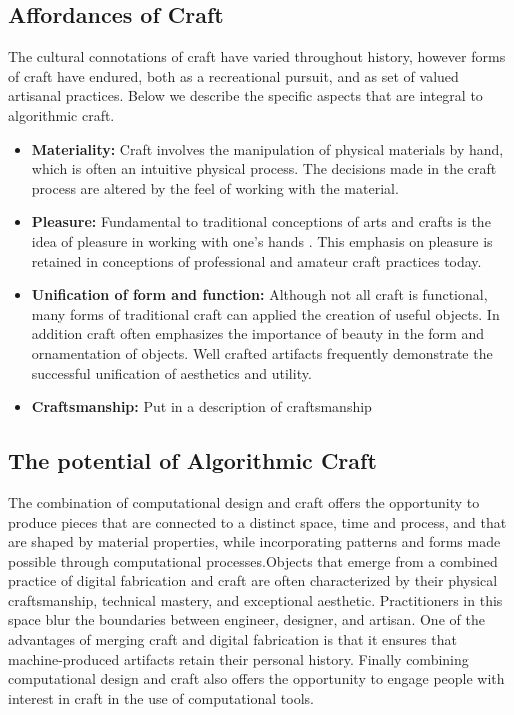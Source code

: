 \documentclass{sigchi}
\begin{document}
\subsection{Affordances of Craft}
The cultural connotations of craft have varied throughout history, however forms of craft have endured, both as a recreational pursuit, and as set of valued artisanal practices. Below we describe the specific aspects that are integral to algorithmic craft.
\begin{itemize}
\item \textbf{Materiality:} Craft involves the manipulation of physical materials by hand, which is often an intuitive physical process. The decisions made in the craft process are altered by the feel of working with the material. 

\item \textbf{Pleasure:} Fundamental to traditional conceptions of arts and crafts is the idea of pleasure in working with one's hands \cite{abstracting_craft}. This emphasis on pleasure is retained in conceptions of professional and amateur craft practices today.

\item \textbf{Unification of form and function:} Although not all craft is functional, many forms of traditional craft can applied the creation of useful objects. In addition craft often emphasizes the importance of beauty in the form and ornamentation of objects. Well crafted artifacts frequently demonstrate the successful unification of aesthetics and utility.

\item \textbf{Craftsmanship:} Put in a description of craftsmanship
\end{itemize}

\subsection{The potential of Algorithmic Craft}
The combination of computational design and craft offers the opportunity to produce pieces that are connected to a distinct space, time and process, and that are shaped by material properties, while incorporating patterns and forms made possible through computational processes.Objects that emerge from a combined practice of digital fabrication and craft are often characterized by their physical craftsmanship, technical mastery, and exceptional aesthetic. Practitioners in this space blur the boundaries between engineer, designer, and artisan. One of the advantages of merging craft and digital fabrication is that it ensures that machine-produced artifacts retain their personal history. Finally combining computational design and craft also offers the opportunity to engage people with interest in craft in the use of computational tools.
\end{document}
